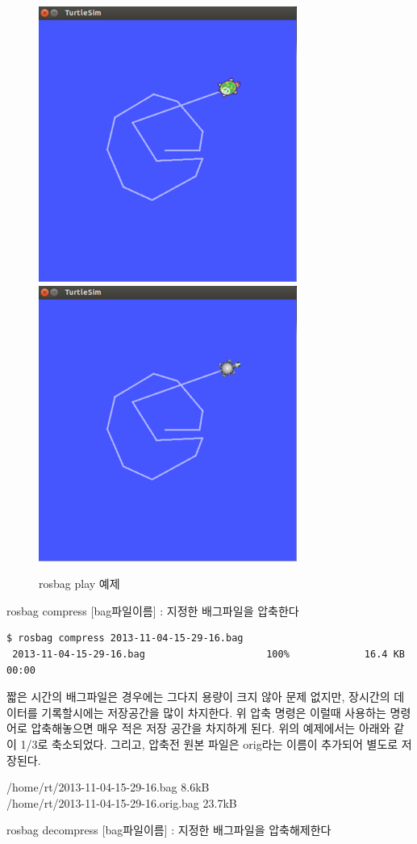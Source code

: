 \begin{figure}[h]
\centering\includegraphics[width=0.4\columnwidth]{pictures/chapter5/rosbag_play1.png}
\centering\includegraphics[width=0.4\columnwidth]{pictures/chapter5/rosbag_play2.png}
\caption{rosbag play 예제}
\end{figure}

\vspace{\baselineskip}
\noindent
{}\circled{\thenum} rosbag compress [bag파일이름] : 지정한 배그파일을 압축한다

\begin{lstlisting}[language=ROS]
$ rosbag compress 2013-11-04-15-29-16.bag 
 2013-11-04-15-29-16.bag                     100%             16.4 KB 00:00  
\end{lstlisting}

\noindent
짧은 시간의 배그파일은 경우에는 그다지 용량이 크지 않아 문제 없지만, 장시간의 데이터를 기록할시에는 저장공간을 많이 차지한다. 위 압축 명령은 이럴때 사용하는 명령어로 압축해놓으면 매우 적은 저장 공간을 차지하게 된다. 위의 예제에서는 아래와 같이 1/3로 축소되었다. 그리고, 압축전 원본 파일은 orig라는 이름이 추가되어 별도로 저장된다.

\vspace{\baselineskip}
\noindent
/home/rt/2013-11-04-15-29-16.bag 8.6kB\\
/home/rt/2013-11-04-15-29-16.orig.bag 23.7kB

\vspace{\baselineskip}
\noindent
{}\circled{\thenum} rosbag decompress [bag파일이름] : 지정한 배그파일을 압축해제한다

